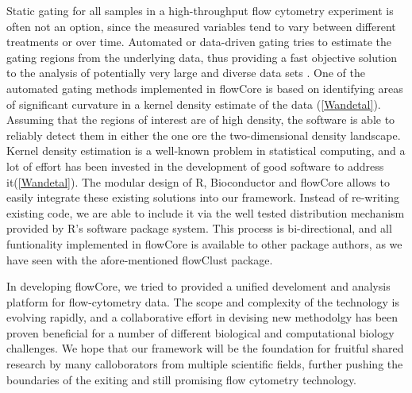 \documentclass[12pt]{article}
\begin{document}
Static gating for all samples in a high-throughput flow cytometry
experiment is often not an option, since the measured variables tend
to vary between different treatments or over time. Automated or
data-driven gating tries to estimate the gating regions from the
underlying data, thus providing a fast objective solution to the
analysis of potentially very large and diverse data sets
\cite{lo2008agf}. One of the automated gating methods implemented in
flowCore is based on identifying areas of significant curvature in a
kernel density estimate of the data (\ref{Wandetal}). Assuming that
the regions of interest are of high density, the software is able to
reliably detect them in either the one ore the two-dimensional density
landscape. Kernel density estimation is a well-known problem in
statistical computing, and a lot of effort has been invested in the
development of good software to address it(\ref{Wandetal}). The
modular design of R, Bioconductor and flowCore allows to easily
integrate these existing solutions into our framework. Instead of
re-writing existing code, we are able to include it via the well
tested distribution mechanism provided by R's software package
system. This process is bi-directional, and all funtionality
implemented in flowCore is available to other package authors, as we
have seen with the afore-mentioned flowClust package.

In developing flowCore, we tried to provided a unified develoment and
analysis platform for flow-cytometry data. The scope and complexity of
the technology is evolving rapidly, and a collaborative effort in
devising new methodolgy has been proven beneficial for a number of
different biological and computational biology challenges. We hope
that our framework will be the foundation for fruitful shared research
by many calloborators from multiple scientific fields, further pushing
the boundaries of the exiting and still promising flow
cytometry technology.



  
 
\end{document}
